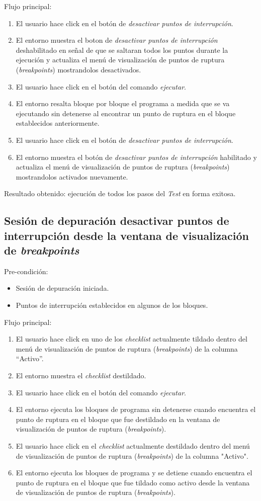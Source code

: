 Flujo principal:
\begin{enumerate}
	\item
	El usuario hace click en el botón de \emph{desactivar puntos de interrupción}.
	\item
	El entorno muestra el boton de \emph{desactivar puntos de interrupción} deshabilitado en señal de que se saltaran todos los puntos durante la ejecución  y actualiza el menú de visualización de puntos de ruptura (\emph{breakpoints}) mostrandolos desactivados.
	\item
	El usuario hace click en el botón del comando \emph{ejecutar}.
	\item
	El entorno resalta bloque por bloque el programa a medida que se va ejecutando sin detenerse al encontrar un punto de ruptura en el bloque establecidos anteriormente.
	\item
	El usuario hace click en el botón de \emph{desactivar puntos de interrupción}.
	\item
	El entorno muestra el botón de \emph{desactivar puntos de interrupción} habilitado y actualiza el menú de visualización de puntos de ruptura (\emph{breakpoints}) mostrandolos activados nuevamente.
\end{enumerate}

Resultado obtenido: ejecución de todos los pasos del \emph{Test} en forma exitosa. 


\subsection{Sesión de depuración desactivar puntos de interrupción desde la ventana de visualización de \emph{breakpoints}}
Pre-condición:
\begin{itemize}
	\item Sesión de depuración iniciada.
	\item Puntos de interrupción establecidos en algunos de los bloques.
\end{itemize}

Flujo principal:
\begin{enumerate}
	\item
	El usuario hace click en uno de los \emph{checklist} actualmente tildado dentro del menú de visualización de puntos de ruptura (\emph{breakpoints}) de la columna “Activo”.
	\item
	El entorno muestra el \emph{checklist} destildado.
	\item
	El usuario hace click en el botón del comando \emph{ejecutar}.
	\item
	El entorno ejecuta los bloques de programa sin detenerse cuando encuentra el punto de ruptura en el bloque que fue destildado en la ventana de visualización de puntos de ruptura (\emph{breakpoints}).
	\item
	El usuario hace click en el \emph{checklist} actualmente destildado dentro del menú de visualización de puntos de ruptura (\emph{breakpoints}) de la columna "Activo".
	\item
	El entorno ejecuta los bloques de programa y se detiene cuando encuentra el punto de ruptura en el bloque que fue tildado como activo desde la ventana de visualización de puntos de ruptura (\emph{breakpoints}).
\end{enumerate}

